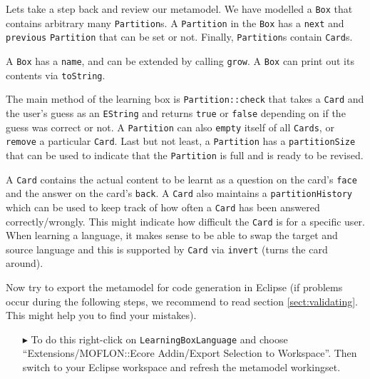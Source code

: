 Lets take a step back and review our metamodel.
We have modelled a \texttt{Box} that contains arbitrary many \texttt{Partition}s.
A \texttt{Partition} in the \texttt{Box} has a \texttt{next} and \texttt{previous} \texttt{Partition} that can be set or not. Finally, \texttt{Partition}s contain \texttt{Card}s.

A \texttt{Box} has a \texttt{name}, and can be extended by calling \texttt{grow}.
A \texttt{Box} can print out its contents via \texttt{toString}.

The main method of the learning box is \texttt{Partition::check} that takes a \texttt{Card} and the user's guess as an \texttt{EString} and returns \texttt{true} or \texttt{false} depending on if the guess was correct or not.
A \texttt{Partition} can also \texttt{empty} itself of all \texttt{Cards}, or \texttt{remove} a particular \texttt{Card}.
Last but not least, a \texttt{Partition} has a \texttt{partitionSize} that can be used to indicate that the \texttt{Partition} is full and is ready to be revised.

A \texttt{Card} contains the actual content to be learnt as a question on the card's \texttt{face} and the answer on the card's \texttt{back}.
A \texttt{Card} also maintains a \texttt{partition\-History} which can be used to keep track of how often a \texttt{Card} has been answered correctly/wrongly.
This might indicate how difficult the \texttt{Card} is for a specific user.
When learning a language, it makes sense to be able to swap the target and source language and this is supported by \texttt{Card} via \texttt{invert} (turns the card around).

Now try to export the metamodel for code generation in Eclipse (if problems occur during the following steps, we recommend to read section \ref{sect:validating}. This might help you to find your mistakes).

\begin{enumerate}
\item[$\blacktriangleright$] To do this right-click on \texttt{LearningBoxLanguage} and choose ``Extensions/MOFLON::Ecore Addin/Export Selection to Workspace''.
Then switch to your Eclipse work\-space and refresh the metamodel workingset.
\end{enumerate}


